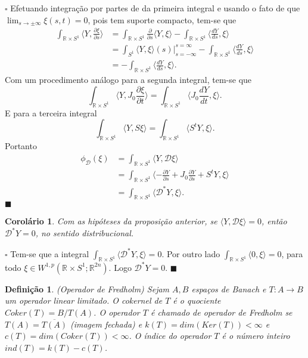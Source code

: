 \documentclass[12pt]{book}
\newtheorem{corolario}[teorema]{Corolário}
\newtheorem{definicao}[teorema]{Definição}
\newenvironment{prova}[1]{$\square$ #1}{\hfill$\blacksquare$}
\newcommand{\circulo}{S^{1}}
\newcommand{\diferencialfloerabrev}{\mathcal{D}}
\newcommand{\derivada}[2]{\frac{d #1}{d #2}}
\newcommand{\derivadaparcial}[2]{\frac{\partial #1}{\partial #2}}
\newcommand{\espacosobolevcontradominio}[2]{W^{1,p}(#1;#2)}
\newcommand{\espacosobolevretacirculo}{\espacosobolevcontradominio{\retacartesianocirculo}{\real{2n}}}
\newcommand{\estruturacomplexa}{J_{0}}
\newcommand{\produtointerno}[2]{\langle #1, #2 \rangle}
\newcommand{\retacartesianocirculo}{\real{} \times \circulo}
\newcommand{\real}[1]{\mathbb{R}^{#1}}
\begin{document}
\begin{prova}
		Efetuando integração por partes de da primeira integral e usando o fato de que $\lim_{s\to \pm \infty}\xi(s,t) = 0$, pois tem suporte compacto, tem-se que
		$$
		\begin{aligned}
		\int_{\retacartesianocirculo}\produtointerno{Y}{\derivadaparcial{\xi}{s}}
		&=\int_{\retacartesianocirculo}\derivadaparcial{}{s}\produtointerno{Y}{\xi} - \int_{\retacartesianocirculo}\produtointerno{\derivada{Y}{s}}{\xi} 
		\\
		&=\int_{\circulo}\produtointerno{Y}{\xi}(s)\Big|_{s=-\infty}^{s=\infty} -\int_{\retacartesianocirculo}\produtointerno{\derivada{Y}{s}}{\xi}
		\\
		&=-\int_{\retacartesianocirculo}\produtointerno{\derivada{Y}{s}}{\xi}.
		\end{aligned}
		$$
		Com um procedimento análogo para a segunda integral, tem-se que
		$$
		\int_{\retacartesianocirculo}\produtointerno{Y}{\estruturacomplexa\derivadaparcial{\xi}{t}} = \int_{\retacartesianocirculo}\produtointerno{\estruturacomplexa \derivada{Y}{t}}{\xi}.
		$$
		E para a terceira integral
		$$
		\int_{\retacartesianocirculo}\produtointerno{Y}{S\xi}= \int_{\retacartesianocirculo}\produtointerno{S^{t}Y}{\xi}.
		$$
		Portanto
		$$
		\begin{aligned}
		\phi_{\diferencialfloerabrev}(\xi) 
		&= \int_{\retacartesianocirculo}\produtointerno{Y}{\diferencialfloerabrev\xi}
		\\
		&=
		\int_{\retacartesianocirculo}\produtointerno{-\derivadaparcial{Y}{s}+\estruturacomplexa \derivadaparcial{Y}{s} + S^{t}Y}{\xi}
		\\
		&=\int_{\retacartesianocirculo}\produtointerno{\diferencialfloerabrev^{*}Y}{\xi}.
		\end{aligned}
		$$
	\end{prova}
	
	\begin{corolario}
		Com as hipóteses da proposição anterior, se $\produtointerno{Y}{\diferencialfloerabrev\xi} = 0$, então $\diferencialfloerabrev^{*}Y = 0$, no sentido distribucional.
	\end{corolario}
	\begin{prova}
		Tem-se que a integral $\int_{\retacartesianocirculo}\produtointerno{\diferencialfloerabrev^{*}Y}{\xi}=0$. Por outro lado $ \int_{\retacartesianocirculo}\produtointerno{0}{\xi} =0$, para todo $\xi \in \espacosobolevretacirculo$. Logo $\diferencialfloerabrev^{*}Y = 0$.
	\end{prova}
	
	\begin{definicao}\label{definicao_oeprador_fredholm}
		(Operador de Fredholm) Sejam $A, B$ espaços de Banach e $T: A\to B$ um operador linear limitado. O cokernel de $T$ é o quociente $Coker(T)=B/T(A)$. O operador $T$ é chamado de operador de Fredholm se $T(A)=\overline{T(A)}$ (imagem fechada) e $k(T) = dim(Ker(T)) < \infty$ e $c(T)=dim(Coker(T)) < \infty$. O índice do operador $T$ é o número inteiro $ind(T) = k(T) - c(T)$. 
	\end{definicao}
	
\end{document}
